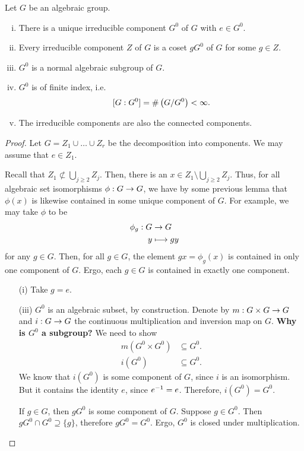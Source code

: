 \begin{theorem}
	Let $G$ be an algebraic group.
	\begin{enumerate}[(i)]
		\item There is a unique irreducible component $G^0$ of $G$ with $e \in G^0$.
		\item Every irreducible component $Z$ of $G$ is a coset $gG^0$ of $G$ for some $g\in Z$.
		\item $G^0$ is a normal algebraic subgroup of $G$.
		\item $G^0$ is of finite index, i.e.
		\[ [G: G^0] = \# \left(G / G^0\right) < \infty. \]
		\item 	The irreducible components are also the connected components.
	\end{enumerate}
\end{theorem}
\begin{proof}
Let $G = Z_1 \cup \ldots \cup Z_r$ be the decomposition into components. 
We may assume that $e \in Z_1$.

Recall that $Z_1 \not \subset \bigcup_{j \geq 2} Z_j$.
Then, there is an $x \in Z_1 \setminus \bigcup_{j \geq 2} Z_j$.
Thus, for all algebraic set isomorphisms $\phi : G \overset{}{\rightarrow} G$, we have by some previous lemma
that $ \phi (x)$ is likewise contained in some unique component of $G$.
For example, we may take $\phi$ to be 
\begin{align*}
\phi_g : G& \overset{}{\rightarrow} G\\
y &\longmapsto gy
\end{align*}
for any $g \in G$.
Then, for all $g\in G$, the element $gx = \phi_g(x)$ is contained in only one component of $G$. Ergo, each $g \in G$ is contained in exactly one component.
	\begin{enumerate}
	\item[(i)] Take $g = e$.
	\item[(iii)] $G^0$ is an algebraic subset, by construction. Denote by $m : G \times G \overset{}{\rightarrow} G$ and $i : G \overset{}{\rightarrow} G$ the continuous multiplication and inversion map on $G$.
	\textbf{Why is $G^0$ a subgroup?} We need to show
	\begin{align*}
	 m(G^0 \times G^0) &\subseteq G^0.\\
	i(G^0) &\subseteq G^0. 
	\end{align*}
	We know that $i(G^0)$ is some component of $G$, since $i$ is an isomorphism. But it contains the identity $e$, since $e^{-1} = e$. Therefore, $i(G^0) = G^0$.
	
	If $g \in G$, then $gG^0$ is some component of $G$. Suppose $g \in G^0$. Then $gG^0 \cap G^0 \supseteq \{g\}$, therefore $gG^0 = G^0$. Ergo, $G^0$ is closed under multiplication.
	

\end{enumerate}
\end{proof}
